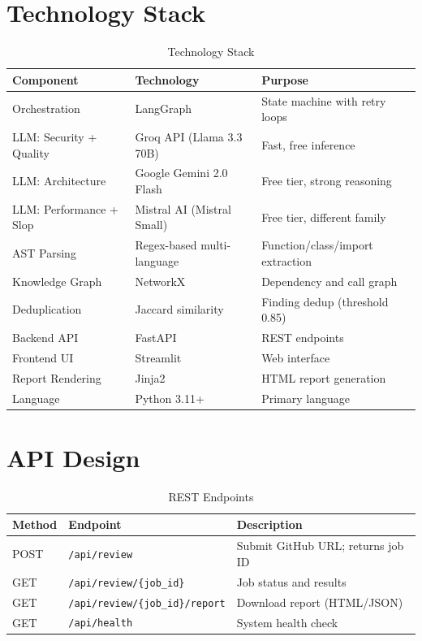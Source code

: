 \documentclass[12pt,a4paper]{article}
\begin{document}
\section{Technology Stack}

\begin{table}[H]
\centering
\caption{Technology Stack}
\begin{tabularx}{\textwidth}{lXl}
\toprule
\textbf{Component} & \textbf{Technology} & \textbf{Purpose} \\
\midrule
Orchestration & LangGraph & State machine with retry loops \\
LLM: Security + Quality & Groq API (Llama 3.3 70B) & Fast, free inference \\
LLM: Architecture & Google Gemini 2.0 Flash & Free tier, strong reasoning \\
LLM: Performance + Slop & Mistral AI (Mistral Small) & Free tier, different family \\
AST Parsing & Regex-based multi-language & Function/class/import extraction \\
Knowledge Graph & NetworkX & Dependency and call graph \\
Deduplication & Jaccard similarity & Finding dedup (threshold 0.85) \\
Backend API & FastAPI & REST endpoints \\
Frontend UI & Streamlit & Web interface \\
Report Rendering & Jinja2 & HTML report generation \\
Language & Python 3.11+ & Primary language \\
\bottomrule
\end{tabularx}
\end{table}

\section{API Design}

\begin{table}[H]
\centering
\caption{REST Endpoints}
\begin{tabularx}{\textwidth}{llX}
\toprule
\textbf{Method} & \textbf{Endpoint} & \textbf{Description} \\
\midrule
POST & \texttt{/api/review} & Submit GitHub URL; returns job ID \\
GET & \texttt{/api/review/\{job\_id\}} & Job status and results \\
GET & \texttt{/api/review/\{job\_id\}/report} & Download report (HTML/JSON) \\
GET & \texttt{/api/health} & System health check \\
\bottomrule
\end{tabularx}
\end{table}
\end{document}

